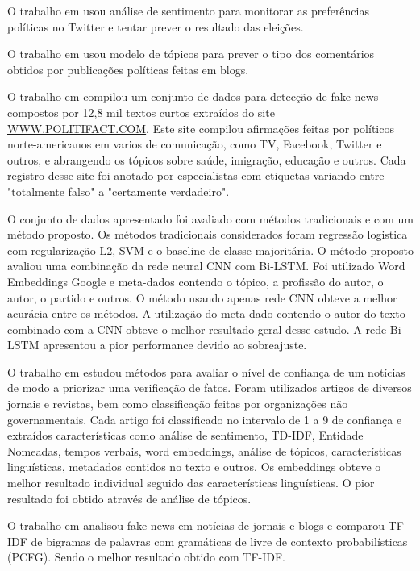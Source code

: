 \documentclass{llncs}
\begin{document}
	O trabalho em \cite{Bermingham2011} usou análise de sentimento para monitorar as preferências políticas no Twitter e tentar prever o resultado das eleições.
	
	O trabalho em \cite{Yano2009} usou modelo de tópicos para prever o tipo dos comentários obtidos por publicações políticas feitas em blogs.
	
	O trabalho em \cite{Wang17} compilou um conjunto de dados para detecção de fake news compostos por 12,8 mil textos curtos extraídos do site  \url{WWW.POLITIFACT.COM}. Este site compilou afirmações feitas por políticos norte-americanos em varios de comunicação, como TV, Facebook, Twitter e outros, e abrangendo os tópicos sobre saúde, imigração, educação e outros. Cada registro desse site foi anotado por especialistas com etiquetas variando entre "totalmente falso" a "certamente verdadeiro".
	
	O conjunto de dados apresentado foi avaliado com métodos tradicionais e com um método proposto. Os métodos tradicionais considerados foram regressão logistica com regularização L2, SVM e o baseline de classe majoritária. O método proposto avaliou uma combinação da rede neural CNN com Bi-LSTM. Foi utilizado Word Embeddings Google  e meta-dados contendo o tópico, a profissão do autor, o autor, o partido e outros. O método usando apenas rede CNN obteve a melhor acurácia entre os métodos. A utilização do meta-dado contendo o autor do texto combinado com a CNN obteve o melhor resultado geral desse estudo. A rede Bi-LSTM apresentou a pior performance devido ao sobreajuste.
	
	
	O trabalho em \cite{Gencheva2017} estudou métodos para avaliar o nível de confiança de um notícias de modo a priorizar uma verificação de fatos. Foram utilizados artigos de diversos jornais e revistas, bem como classificação feitas por organizações não governamentais. Cada artigo foi classificado no intervalo de 1 a 9 de confiança e extraídos características como análise de sentimento, TD-IDF,  Entidade Nomeadas, tempos verbais, word embeddings, análise de tópicos, características linguísticas, metadados contidos no texto e outros. Os embeddings obteve o melhor resultado individual seguido das características linguísticas. O pior resultado foi obtido através de análise de tópicos. 
	
	O trabalho em \cite{Gilda2018110} analisou fake news em notícias de jornais e blogs  e comparou TF-IDF de bigramas de palavras com gramáticas de livre de contexto probabilísticas (PCFG). Sendo o melhor resultado obtido com TF-IDF.
	
\end{document}
